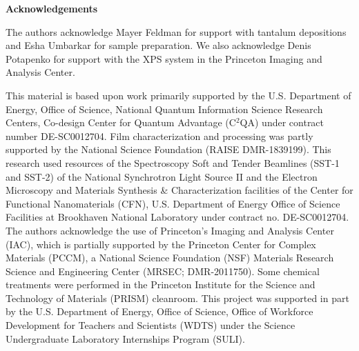 \documentclass{WileyMSP-template}
\begin{document}
\medskip
\textbf{Acknowledgements} \par %
The authors acknowledge Mayer Feldman for support with tantalum depositions and Esha Umbarkar for sample preparation. We also acknowledge Denis Potapenko for support with the XPS system in the Princeton Imaging and Analysis Center.

This material is based upon work primarily supported by the U.S. Department of Energy, Office of Science, National Quantum Information Science Research Centers, Co-design Center for Quantum Advantage (C$^2$QA) under contract number DE-SC0012704. Film characterization and processing was partly supported by the National Science Foundation (RAISE DMR-1839199). This research used resources of the Spectroscopy Soft and Tender Beamlines (SST-1 and SST-2) of the National Synchrotron Light Source II and the Electron Microscopy and Materials Synthesis \& Characterization facilities of the Center for Functional Nanomaterials (CFN), U.S. Department of Energy Office of Science Facilities at Brookhaven National Laboratory under contract no. DE-SC0012704. The authors acknowledge the use of Princeton’s Imaging and Analysis Center (IAC), which is partially supported by the Princeton Center for Complex Materials (PCCM), a National Science Foundation (NSF) Materials Research Science and Engineering Center (MRSEC; DMR-2011750). Some chemical treatments were performed in the Princeton Institute for the Science and Technology of Materials (PRISM) cleanroom. This project was supported in part by the U.S. Department of Energy, Office of Science, Office of Workforce Development for Teachers and Scientists (WDTS) under the Science Undergraduate Laboratory Internships Program (SULI).
\end{document}
